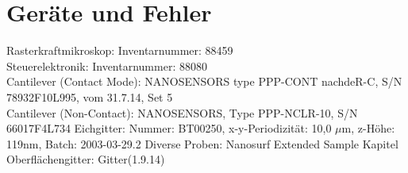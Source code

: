 \section{Geräte und Fehler}

Rasterkraftmikroskop: Inventarnummer: 88459\\
Steuerelektronik: Inventarnummer: 88080\\
Cantilever (Contact Mode): NANOSENSORS type PPP-CONT nachdeR-C, S/N 78932F10L995, vom 31.7.14, Set 5\\
Cantilever (Non-Contact): NANOSENSORS, Type PPP-NCLR-10, S/N 66017F4L734
Eichgitter: Nummer: BT00250, x-y-Periodizität: 10,0 $\mu$m, z-Höhe: 119nm, Batch: 2003-03-29.2
Diverse Proben: Nanosurf Extended Sample Kapitel\\
Oberflächengitter: Gitter(1.9.14)



%
%
